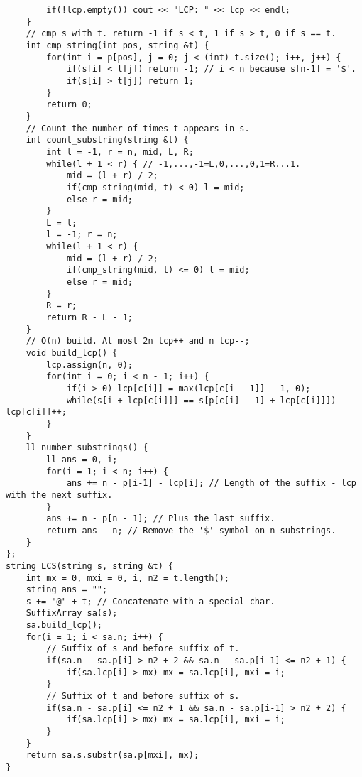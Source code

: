 \documentclass[a4paper,10pt]{article}
\begin{document}
\begin{multicols}{2}
\begin{verbatim}
        if(!lcp.empty()) cout << "LCP: " << lcp << endl;
    }
    // cmp s with t. return -1 if s < t, 1 if s > t, 0 if s == t.
    int cmp_string(int pos, string &t) {
        for(int i = p[pos], j = 0; j < (int) t.size(); i++, j++) {
            if(s[i] < t[j]) return -1; // i < n because s[n-1] = '$'.
            if(s[i] > t[j]) return 1;
        }
        return 0;
    }
    // Count the number of times t appears in s.
    int count_substring(string &t) {
        int l = -1, r = n, mid, L, R;
        while(l + 1 < r) { // -1,...,-1=L,0,...,0,1=R...1.
            mid = (l + r) / 2;
            if(cmp_string(mid, t) < 0) l = mid;
            else r = mid;
        }
        L = l;
        l = -1; r = n;
        while(l + 1 < r) {
            mid = (l + r) / 2;
            if(cmp_string(mid, t) <= 0) l = mid;
            else r = mid;
        }
        R = r;
        return R - L - 1;
    }
    // O(n) build. At most 2n lcp++ and n lcp--;
    void build_lcp() {
        lcp.assign(n, 0);
        for(int i = 0; i < n - 1; i++) {
            if(i > 0) lcp[c[i]] = max(lcp[c[i - 1]] - 1, 0);
            while(s[i + lcp[c[i]]] == s[p[c[i] - 1] + lcp[c[i]]]) lcp[c[i]]++;
        }
    }
    ll number_substrings() {
        ll ans = 0, i;
        for(i = 1; i < n; i++) {
            ans += n - p[i-1] - lcp[i]; // Length of the suffix - lcp with the next suffix.
        }
        ans += n - p[n - 1]; // Plus the last suffix.
        return ans - n; // Remove the '$' symbol on n substrings.
    }
};
string LCS(string s, string &t) {
    int mx = 0, mxi = 0, i, n2 = t.length();
    string ans = "";
    s += "@" + t; // Concatenate with a special char.
    SuffixArray sa(s);
    sa.build_lcp();
    for(i = 1; i < sa.n; i++) {
        // Suffix of s and before suffix of t.
        if(sa.n - sa.p[i] > n2 + 2 && sa.n - sa.p[i-1] <= n2 + 1) {
            if(sa.lcp[i] > mx) mx = sa.lcp[i], mxi = i;
        }
        // Suffix of t and before suffix of s.
        if(sa.n - sa.p[i] <= n2 + 1 && sa.n - sa.p[i-1] > n2 + 2) {
            if(sa.lcp[i] > mx) mx = sa.lcp[i], mxi = i;
        }
    }
    return sa.s.substr(sa.p[mxi], mx);
}
\end{verbatim}
\end{multicols}
\end{document}
